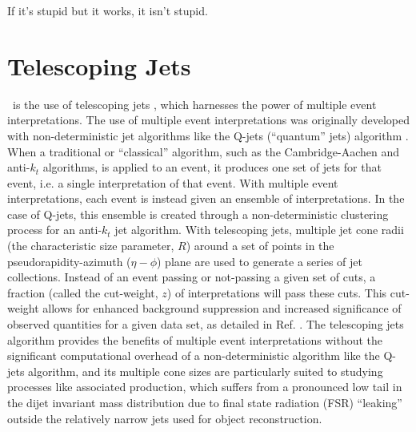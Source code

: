 \begin{savequote}[75mm]
If it's stupid but it works, it isn't stupid.
\end{savequote}

\chapter{Telescoping Jets}

 \ZH\, is the use of telescoping jets \cite{teljet}, which harnesses the power of multiple event interpretations.  The use of multiple event interpretations was originally developed with non-deterministic jet algorithms like the Q-jets (``quantum'' jets) algorithm \cite{qjet}.  When a traditional or ``classical'' algorithm, such as the Cambridge-Aachen\cite{ca} and anti-$k_t$\cite{akt} algorithms, is applied to an event, it  produces one set of jets for that event, i.e. a single interpretation of that event.  With multiple event interpretations, each event is instead given an ensemble of interpretations.  In the case of Q-jets, this ensemble is created through a non-deterministic clustering process for an anti-$k_t$ jet algorithm.  With telescoping jets, multiple jet cone radii (the characteristic size parameter, $R$) around a set of points in the pseudorapidity-azimuth ($\eta-\phi$) plane are used to generate a series of jet collections.  Instead of an event passing or not-passing a given set of cuts, a fraction (called the cut-weight, $z$) of interpretations will pass these cuts.  This cut-weight allows for enhanced background suppression and increased significance of observed quantities for a given data set, as detailed in Ref. \cite{multint}.  The telescoping jets algorithm provides the benefits of multiple event interpretations without the significant computational overhead of a non-deterministic  algorithm like the Q-jets algorithm, and its multiple cone sizes are particularly suited to studying processes like associated production, which suffers from a pronounced low tail in the dijet invariant mass distribution due to final state radiation (FSR) ``leaking'' outside the relatively narrow jets used for object reconstruction. 


